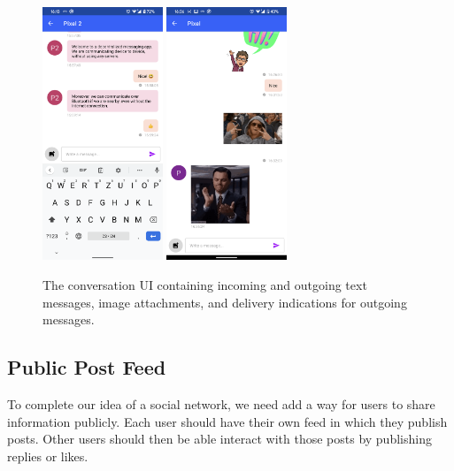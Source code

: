 \begin{figure}
    \centering
    \includegraphics[width=0.32\textwidth]{screens/superapp/conversation_text}
    \includegraphics[width=0.32\textwidth]{screens/superapp/conversation}
    \caption{The conversation UI containing incoming and outgoing text messages, image attachments, and delivery indications for outgoing messages.}
    \label{peerchat_conversation}
\end{figure}

\subsection{Public Post Feed}

To complete our idea of a social network, we need add a way for users to share information publicly. Each user should have their own feed in which they publish posts. Other users should then be able interact with those posts by publishing replies or likes.

